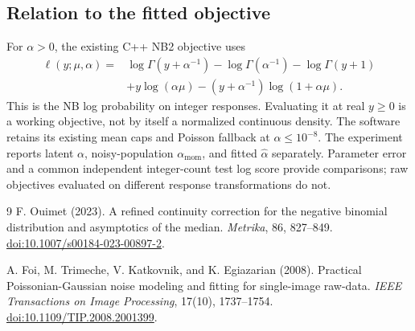 \documentclass[11pt]{article}
\begin{document}
\subsection{Relation to the fitted objective}
For $\alpha>0$, the existing C++ NB2 objective uses
\begin{align}
  \ell(y;\mu,\alpha)
   ={}&\log\Gamma(y+\alpha^{-1})-\log\Gamma(\alpha^{-1})
       -\log\Gamma(y+1)\nonumber\\
     &+y\log(\alpha\mu)-(y+\alpha^{-1})\log(1+\alpha\mu).
\end{align}
This is the NB log probability on integer responses. Evaluating it at real
$y\geq0$ is a working objective, not by itself a normalized continuous
density. The software retains its existing mean caps and Poisson fallback
at $\alpha\leq10^{-8}$. The experiment reports latent $\alpha$, noisy-population
$\alpha_{\mathrm{mom}}$, and fitted $\widehat\alpha$ separately. Parameter error
and a common independent integer-count test log score provide comparisons;
raw objectives evaluated on different response transformations do not.

\begin{thebibliography}{9}
F. Ouimet (2023).
A refined continuity correction for the negative binomial distribution and
asymptotics of the median.
\emph{Metrika}, 86, 827--849.
\href{https://doi.org/10.1007/s00184-023-00897-2}
{doi:10.1007/s00184-023-00897-2}.

A. Foi, M. Trimeche, V. Katkovnik, and K. Egiazarian (2008).
Practical Poissonian-Gaussian noise modeling and fitting for single-image
raw-data.
\emph{IEEE Transactions on Image Processing}, 17(10), 1737--1754.
\href{https://doi.org/10.1109/TIP.2008.2001399}
{doi:10.1109/TIP.2008.2001399}.
\end{thebibliography}
\end{document}
